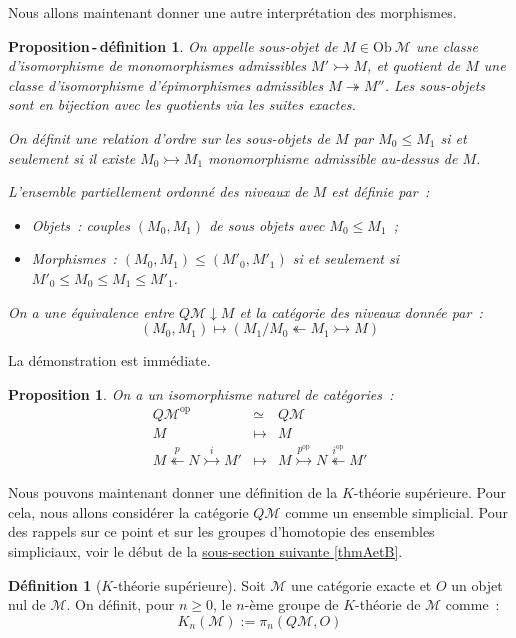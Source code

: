 \documentclass{amsart}
\newcommand{\sref}[2]{\hyperref[#2]{#1 \ref*{#2}}}
\theoremstyle{plain}
\newtheorem{prop}[theo]{Proposition}
\newtheorem{propdefi}[theo]{Proposition\,-\,définition}
\theoremstyle{definition}
\newtheorem{defi}[theo]{Définition}
\theoremstyle{remark}
\newcommand{\M}{\mathcal{M}}
\newcommand{\Ob}[1]{\mathrm{Ob}\:#1}
\newcommand{\op}{^\mathrm{op}}
\newcommand{\xrightarrowtail}[1]{\overset{#1}{\rightarrowtail}}
\newcommand{\xtwoheadleftarrow}[1]{\overset{#1}{\twoheadleftarrow}}
\begin{document}
Nous allons maintenant donner une autre interprétation des morphismes.

\begin{propdefi}
  On appelle sous-objet de $M\in \Ob \M$ une classe d'isomorphisme de monomorphismes admissibles $M'\rightarrowtail M$, et quotient de $M$
  une classe d'isomorphisme d'épimorphismes admissibles $M\twoheadrightarrow M''$. Les sous-objets sont en bijection avec les quotients via les
  suites exactes.

  On définit une relation d'ordre sur les sous-objets de $M$ par $M_0\leq M_1$ si et seulement si il existe $M_0\rightarrowtail M_1$ monomorphisme
  admissible au-dessus  de $M$.
  
  L'ensemble partiellement ordonné des niveaux de $M$ est définie par~:
  \begin{itemize}
    \item[$\bullet$] Objets~: couples $(M_0,M_1)$ de sous objets avec $M_0\leq M_1$~;
    \item[$\bullet$] Morphismes~: $(M_0,M_1)\leq (M'_0,M'_1)$ si et seulement si $M'_0\leq M_0\leq M_1\leq M'_1$. 
  \end{itemize}

  On a une équivalence entre $Q\M\downarrow M$ et la catégorie des niveaux donnée par~:
  $$(M_0,M_1)\mapsto (M_1/M_0\twoheadleftarrow M_1\rightarrowtail M)$$
\end{propdefi}

La démonstration est immédiate.

\begin{prop}
  On a un isomorphisme naturel de catégories~:
  \[
    \begin{array}{ccc}
      Q\M\op                                        &\simeq & Q\M \\
      M                                             &\mapsto& M   \\
      M\xtwoheadleftarrow{p} N\xrightarrowtail{i} M' &\mapsto& M \xrightarrowtail{p\op} N\xtwoheadleftarrow{i\op}M'
    \end{array}
  \]
\end{prop}

Nous pouvons maintenant donner une définition de la $K$-théorie supérieure. Pour cela, nous allons considérer la catégorie
$Q\M$ comme un ensemble simplicial. Pour des rappels sur ce point et sur les groupes d'homotopie des ensembles simpliciaux, voir le début de
la \sref{sous-section suivante}{thmAetB}.

\begin{defi}[$K$-théorie supérieure]
  Soit $\M$ une catégorie exacte et $O$ un objet nul de $\M$. On définit, pour $n\geq 0$, le $n$-ème groupe de $K$-théorie de $\M$ comme~:
  $$K_n(\M):=\pi_n(Q\M,O)$$
\end{defi}
\end{document}
